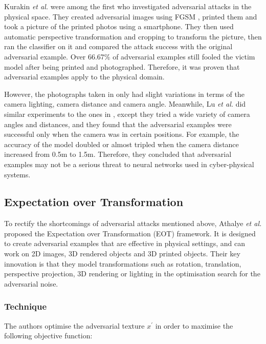 Kurakin \textit{et al.} \cite{kurakin2016adversarial} were among the first who investigated adversarial attacks in the physical space. They created adversarial images using FGSM \cite{fgsm}, printed them and took a picture of the printed photos using a smartphone. They then used automatic perspective transformation and cropping to transform the picture, then ran the classifier on it and compared the attack success with the original adversarial example. Over 66.67\% of adversarial examples still fooled the victim model after being printed and photographed. Therefore, it was proven that adversarial examples apply to the physical domain.

However, the photographs taken in \cite{kurakin2016adversarial} only had slight variations in terms of the camera lighting, camera distance and camera angle. Meanwhile, Lu \textit{et al.} \cite{lu_physical_experiments} did similar experiments to the ones in \cite{kurakin2016adversarial}, except they tried a wide variety of camera angles and distances, and they found that the adversarial examples were successful only when the camera was in certain positions. For example, the accuracy of the model doubled or almost tripled when the camera distance increased from 0.5m to 1.5m. Therefore, they concluded that adversarial examples may not be a serious threat to neural networks used in cyber-physical systems.

\subsection{Expectation over Transformation}
    \label{subsec:eot}

To rectify the shortcomings of adversarial attacks mentioned above, Athalye \textit{et al.} \cite{athalye} proposed the Expectation over Transformation (EOT) framework. It is designed to create adversarial examples that are effective in physical settings, and can work on 2D images, 3D rendered objects and 3D printed objects. Their key innovation is that they model transformations such as rotation, translation, perspective projection, 3D rendering or lighting in the optimisation search for the adversarial noise. 

\subsubsection{Technique}
    \label{subsubsec:eot_technique}

The authors optimise the adversarial texture $x^\prime$ in order to maximise the following objective function:


